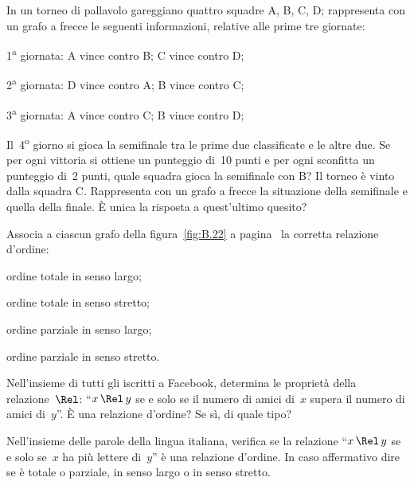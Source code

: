 \begin{multicols}{2}
\begin{esercizio}
\label{ese:B.58}
In un torneo di pallavolo gareggiano quattro squadre A, B, C, D; rappresenta con un grafo a frecce le seguenti informazioni, relative alle prime tre giornate:
\begin{itemize*}
\item 1\textsuperscript{a} giornata: A vince contro B; C vince contro D;
\item 2\textsuperscript{a} giornata: D vince contro A; B vince contro C;
\item 3\textsuperscript{a} giornata: A vince contro C; B vince contro D;
\end{itemize*}
Il~4\textsuperscript{o} giorno si gioca la semifinale tra le prime due classificate e le altre due. Se per ogni vittoria si ottiene un punteggio di~10 punti e per ogni sconfitta un punteggio
di~2 punti, quale squadra gioca la semifinale con B?
Il torneo è vinto dalla squadra C. Rappresenta con un grafo a frecce la situazione della semifinale e quella
della finale. \`E unica la risposta a quest'ultimo quesito?
\end{esercizio}

\begin{esercizio}
\label{ese:B.59}
Associa a ciascun grafo della figura~\ref{fig:B.22} a pagina~\pageref{fig:B.22} la corretta relazione d'ordine:
\begin{enumeratea}
\item ordine totale in senso largo;
\item ordine totale in senso stretto;
\item ordine parziale in senso largo;
\item ordine parziale in senso stretto.
\end{enumeratea}
\end{esercizio}

\begin{esercizio}
\label{ese:B.60}
Nell'insieme di tutti gli iscritti a Facebook, determina le proprietà della relazione~$\Rel$: ``$x \,\Rel\, y$ se e solo se il numero di amici di~$x$ supera
il numero di amici di~$y$''. \`E una relazione d'ordine? Se sì, di quale tipo?
\end{esercizio}

\begin{esercizio}
\label{ese:B.61}
Nell'insieme delle parole della lingua italiana, verifica se la relazione ``$x \,\Rel\, y$ se e solo se~$x$ ha più lettere di~$y$'' è una relazione d'ordine.
In caso affermativo dire se è totale o parziale, in senso largo o in senso stretto.
\end{esercizio}


\end{multicols}
